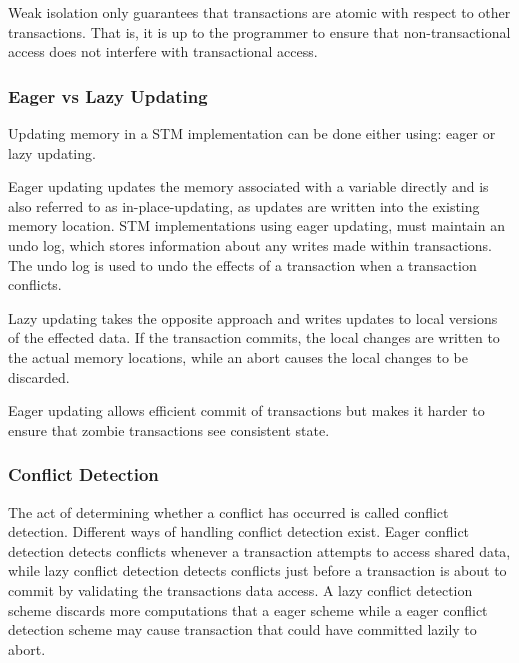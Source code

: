 Weak isolation only guarantees that transactions are atomic with respect to other transactions. That is, it is up to the programmer to ensure that non-transactional access does not interfere with transactional access.

\subsubsection{Eager vs Lazy Updating}
Updating memory in a \ac{STM} implementation can be done either using: eager or lazy updating.

Eager updating updates the memory associated with a variable directly and is also referred to as in-place-updating, as updates are written into the existing memory location\cite[p. 35]{afek2011lowering}. \ac{STM} implementations using eager updating, must maintain an undo log, which stores information about any writes made within transactions. The undo log is used to undo the effects of a transaction when a transaction conflicts\cite[p. 2084]{herlihy2011tm}.

Lazy updating takes the opposite approach and writes updates to local versions of the effected data\cite[p. 2084]{herlihy2011tm}. If the transaction commits, the local changes are written to the actual memory locations, while an abort causes the local changes to be discarded.

Eager updating allows efficient commit of transactions but makes it harder to ensure that zombie transactions see consistent state\cite[p. 2084]{herlihy2011tm}.

\subsubsection{Conflict Detection}
\label{sec:stm_conflict_detection}
The act of determining whether a conflict has occurred is called conflict detection\cite[p. 20]{harris2010transactional}. Different ways of handling conflict detection exist. Eager conflict detection detects conflicts whenever a transaction attempts to access shared data, while lazy conflict detection detects conflicts just before a transaction is about to commit by validating the transactions data access\cite[p. 21]{harris2010transactional}. A lazy conflict detection scheme discards more computations that a eager scheme while a eager conflict detection scheme may cause transaction that could have committed lazily to abort\cite[p. 21]{harris2010transactional}.

